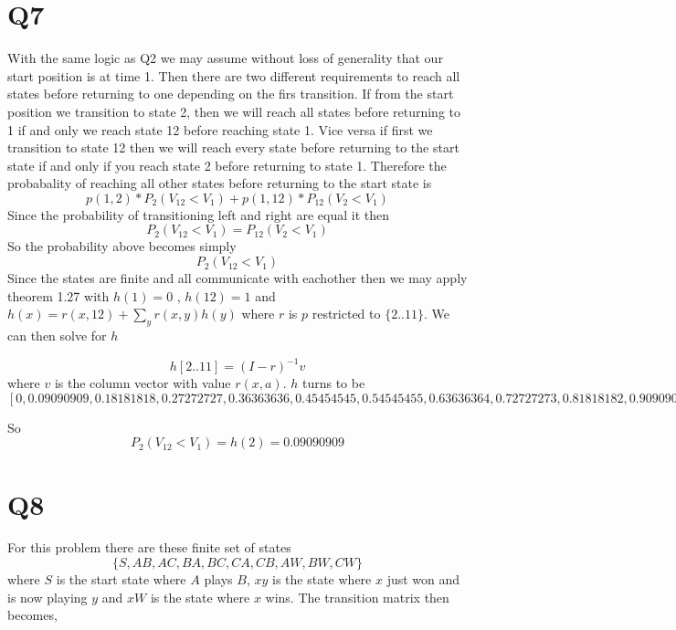 \documentclass{article}
\begin{document}
\section*{Q7}
With the same logic as Q2 we may assume without loss of generality that our start position is at time 1. Then there are two different requirements to reach all states before returning to one depending on the firs transition. If from the start position we transition to state 2, then we will reach all states before returning to 1 if and only we reach state 12 before reaching state 1. Vice versa if first we transition to state 12 then we will reach every state before returning to the start state if and only if you reach state 2 before returning to state 1. 
Therefore the probabality of reaching all other states before returning to the start state is
\[
p(1,2)*P_2(V_12 < V_1) + p(1,12)*P_12(V_2 < V_1)
\]
Since the probability of transitioning left and right are equal it then 
\[
P_2(V_{12} < V_1) = P_12(V_2 < V_1)
\]
So the probability above becomes simply
\[
P_2(V_{12} < V_1)
\]
Since the states are finite and all communicate with eachother then we may apply theorem 1.27 with $h(1) = 0$ , $h(12) = 1$ and $h(x) = r(x,12) + \sum_y r(x,y)h(y)$ where $r$ is $p$ restricted to $\{2..11\}$. 
We can then solve for $h$

\[
h[2 .. 11] = (I -r)^{-1} v
\]
where $v$ is the column vector with value $r(x,a)$.
$h$ turns to be 
\[
[0, 0.09090909,  0.18181818,  0.27272727,  0.36363636,  0.45454545,
        0.54545455,  0.63636364,  0.72727273,  0.81818182,  0.90909091,1]
\]

So
\[
P_2(V_{12} < V_1) = h(2) = 0.09090909
\]

\section*{Q8}
For this problem there are these finite set of states
\[
\{S, AB, AC, BA, BC, CA, CB, AW, BW, CW\}
\]
where $S$ is the start state where $A$ plays $B$, $xy$ is the state where $x$ just won and is now playing $y$ and $xW$ is the state where $x$ wins. 
The transition matrix then becomes,
\end{document}
